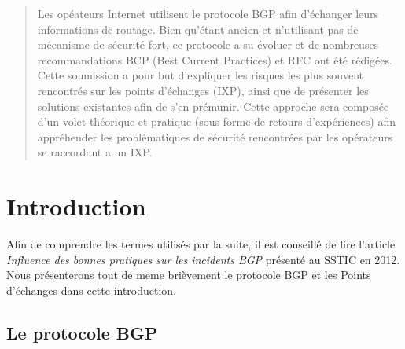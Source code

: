 



\maketitle
{}

\begin{abstract}
 Les opéateurs Internet utilisent le protocole BGP afin d'échanger leurs informations de routage. Bien qu'étant ancien et n'utilisant pas de mécanisme de sécurité fort, ce protocole a su évoluer et de nombreuses recommandations BCP (Best Current Practices) et RFC ont été rédigées.
 Cette soumission a pour but d'expliquer les risques les plus souvent rencontrés sur les points d'échanges (IXP), ainsi que de présenter les solutions existantes afin de s'en prémunir. Cette approche sera composée d'un volet théorique et pratique (sous forme de retours d'expériences) afin appréhender les problématiques de sécurité rencontrées par les opérateurs se raccordant a un IXP.
\end{abstract}


\section{Introduction}

Afin de comprendre les termes utilisés par la suite, il est conseillé de lire l'article \emph{Influence des bonnes pratiques sur les incidents BGP} \cite{fenioux:SSTIC2012} présenté au SSTIC en 2012. Nous présenterons tout de meme brièvement le protocole BGP et les Points d'échanges dans cette introduction.

\subsection{Le protocole BGP}

